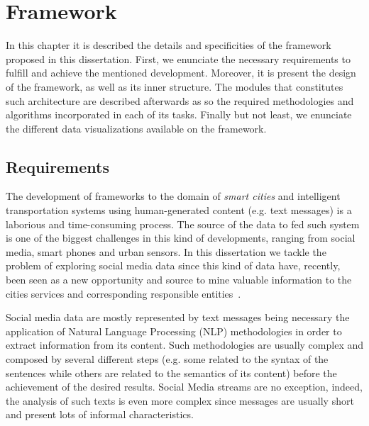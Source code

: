 \chapter{Framework} \label{chap:framework}

\minitoc \mtcskip \noindent

In this chapter it is described the details and specificities of the framework proposed in this dissertation. First, we enunciate the necessary requirements to fulfill and achieve the mentioned development. Moreover, it is present the design of the framework, as well as its inner structure. The modules that constitutes such architecture are described afterwards as so the required methodologies and algorithms incorporated in each of its tasks. Finally but not least, we enunciate the different data visualizations available on the framework.

\section{Requirements}\label{sec:requirements}

The development of frameworks to the domain of \textit{smart cities} and intelligent transportation systems using human-generated content (e.g. text messages) is a laborious and time-consuming process. The source of the data to fed such system is one of the biggest challenges in this kind of developments, ranging from social media, smart phones and urban sensors. In this dissertation we tackle the problem of exploring social media data since this kind of data have, recently, been seen as a new opportunity and source to mine valuable information to the cities services and corresponding responsible entities~\cite{kn:Musto2015}.

Social media data are mostly represented by text messages being necessary the application of Natural Language Processing (NLP) methodologies in order to extract information from its content. Such methodologies are usually complex and composed by several different steps (e.g. some related to the syntax of the sentences while others are related to the semantics of its content) before the achievement of the desired results. Social Media streams are no exception, indeed, the analysis of such texts is even more complex since messages are usually short and present lots of informal characteristics.

